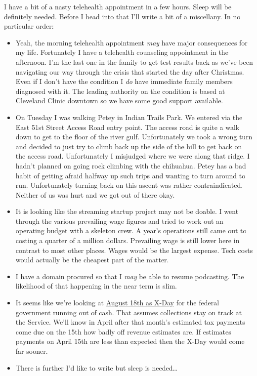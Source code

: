I have a bit of a nasty telehealth appointment in a few hours. Sleep
will be definitely needed. Before I head into that I'll write a bit of a
miscellany. In no particular order:

\begin{itemize}
\tightlist
\item
  Yeah, the morning telehealth appointment \emph{may} have major
  consequences for my life. Fortunately I have a telehealth counseling
  appointment in the afternoon. I'm the last one in the family to get
  test results back as we've been navigating our way through the crisis
  that started the day after Christmas. Even if I don't have the
  condition I \emph{do} have immediate family members diagnosed with it.
  The leading authority on the condition is based at Cleveland Clinic
  downtown so we have some good support available.
\item
  On Tuesday I was walking Petey in Indian Trails Park. We entered via
  the East 51st Street Access Road entry point. The access road is quite
  a walk down to get to the floor of the river gulf. Unfortunately we
  took a wrong turn and decided to just try to climb back up the side of
  the hill to get back on the access road. Unfortunately I misjudged
  where we were along that ridge. I hadn't planned on going rock
  climbing with the chihuahua. Petey has a bad habit of getting afraid
  halfway up such trips and wanting to turn around to run. Unfortunately
  turning back on this ascent was rather contraindicated. Neither of us
  was hurt and we got out of there okay.
\item
  It is looking like the streaming startup project may not be doable. I
  went through the various prevailing wage figures and tried to work out
  an operating budget with a skeleton crew. A year's operations still
  came out to costing a quarter of a million dollars. Prevailing wage is
  still lower here in contrast to most other places. Wages would be the
  largest expense. Tech costs would actually be the cheapest part of the
  matter.
\item
  I have a domain procured so that I \emph{may} be able to resume
  podcasting. The likelihood of that happening in the near term is slim.
\item
  It seems like we're looking at
  \href{https://web.archive.org/web/20230308062651/https://www.moodysanalytics.com/-/media/article/2023/going-down-the-debt-limit-rabbit-hole.pdf}{August
  18th as X-Day} for the federal government running out of cash. That
  assumes collections stay on track at the Service. We'll know in April
  after that month's estimated tax payments come due on the 15th how
  badly off revenue estimates are. If estimates payments on April 15th
  are less than expected then the X-Day would come far sooner.
\item
  There is further I'd like to write but sleep is needed\ldots{}
\end{itemize}
